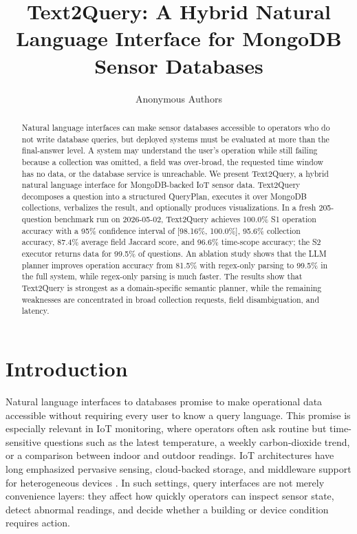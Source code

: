 \documentclass[11pt]{article}
\title{Text2Query: A Hybrid Natural Language Interface for MongoDB Sensor Databases}
\author{Anonymous Authors}
\date{}
\begin{document}
\maketitle

\begin{abstract}
Natural language interfaces can make sensor databases accessible to operators who do not write database queries, but deployed systems must be evaluated at more than the final-answer level. A system may understand the user's operation while still failing because a collection was omitted, a field was over-broad, the requested time window has no data, or the database service is unreachable. We present Text2Query, a hybrid natural language interface for MongoDB-backed IoT sensor data. Text2Query decomposes a question into a structured QueryPlan, executes it over MongoDB collections, verbalizes the result, and optionally produces visualizations. In a fresh 205-question benchmark run on 2026-05-02, Text2Query achieves 100.0\% S1 operation accuracy with a 95\% confidence interval of [98.16\%, 100.0\%], 95.6\% collection accuracy, 87.4\% average field Jaccard score, and 96.6\% time-scope accuracy; the S2 executor returns data for 99.5\% of questions. An ablation study shows that the LLM planner improves operation accuracy from 81.5\% with regex-only parsing to 99.5\% in the full system, while regex-only parsing is much faster. The results show that Text2Query is strongest as a domain-specific semantic planner, while the remaining weaknesses are concentrated in broad collection requests, field disambiguation, and latency.
\end{abstract}

\section{Introduction}

Natural language interfaces to databases promise to make operational data accessible without requiring every user to know a query language. This promise is especially relevant in IoT monitoring, where operators often ask routine but time-sensitive questions such as the latest temperature, a weekly carbon-dioxide trend, or a comparison between indoor and outdoor readings. IoT architectures have long emphasized pervasive sensing, cloud-backed storage, and middleware support for heterogeneous devices \cite{gubbi2013iot,botta2016cloudiot,razzaque2016middleware}. In such settings, query interfaces are not merely convenience layers: they affect how quickly operators can inspect sensor state, detect abnormal readings, and decide whether a building or device condition requires action.
\end{document}
